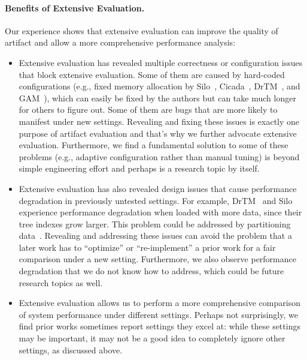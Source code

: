 \vspace{-.1in}
\paragraph{Benefits of Extensive Evaluation.}
Our experience shows that extensive evaluation can improve
the quality of artifact and allow a more comprehensive
performance analysis:

\begin{itemize} [leftmargin=*]

    \vspace{-.05in}
    \item Extensive evaluation has revealed multiple correctness
    or configuration issues that block extensive evaluation.
    Some of them are caused by hard-coded configurations (e.g., fixed memory allocation by Silo~\cite{Tu2013Silo}, Cicada~\cite{Lim2017Cicada}, DrTM~\cite{Wei2015FIT}, and GAM~\cite{Cai2018GAM}),
    which can easily be fixed by the authors but can take much longer
    for others to figure out. Some of them are bugs that are more
    likely to manifest under new settings. Revealing and fixing these
    issues is exactly one purpose of artifact evaluation and that's why
    we further advocate extensive evaluation.
    Furthermore, we find a fundamental solution
    to some of these problems (e.g., adaptive configuration rather than manual
    tuning) is beyond simple engineering effort and perhaps is a research topic by itself.
    
    \vspace{-.05in}
    \item Extensive evaluation has also revealed design issues that
    cause performance degradation in previously untested settings. For example, DrTM~\cite{Wei2015FIT}
    and Silo experience performance degradation when loaded with
    more data, since their tree indexes grow larger. This problem could be addressed
    by partitioning data~\cite{Kalia2014HERD,chang06bigtable,Decandia07Dynamo,Lee2021ShardManager}.
    Revealing and addressing these issues can avoid
    the problem that a later work has to ``optimize'' or ``re-implement'' a prior work for
    a fair comparison under a new setting. Furthermore, we also observe
    performance degradation that we do not know how to address, which
    could be future research topics as well.
    
    \vspace{-.05in}
    \item Extensive evaluation allows us to perform a more comprehensive comparison
    of system performance under different settings. Perhaps
    not surprisingly, we find prior works sometimes report
    settings they excel at: while these settings may be important,
    it may not be a good idea to completely ignore other settings,
    as discussed above.
        
\end{itemize}
\fi